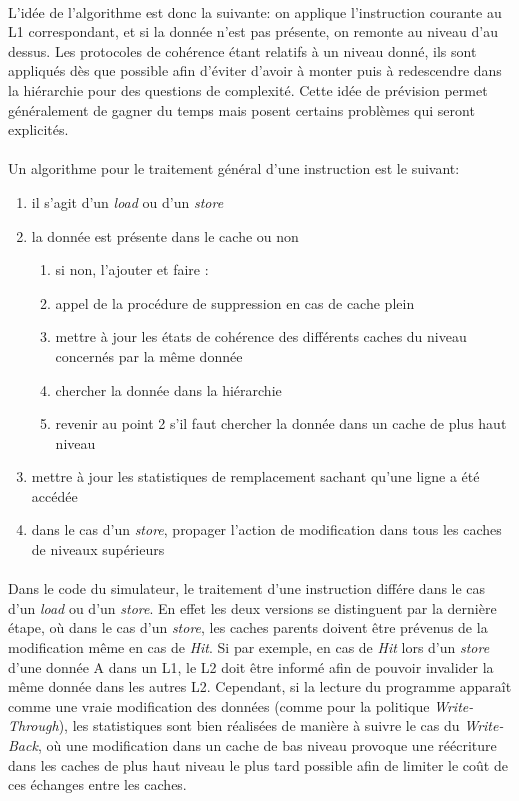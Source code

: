 \paragraph{}
L'idée de l'algorithme est donc la suivante: on applique l'instruction courante au L1 correspondant, et si la donnée n'est pas présente, on remonte au niveau d'au dessus. Les protocoles de cohérence étant relatifs à un niveau donné, ils sont appliqués dès que possible afin d'éviter d'avoir à monter puis à redescendre dans la hiérarchie pour des questions de complexité. Cette idée de prévision permet généralement de gagner du temps mais posent certains problèmes qui seront explicités.

\paragraph{}
Un algorithme pour le traitement général d'une instruction est le suivant: 
\begin{enumerate}
  \item{il s'agit d'un \emph{load} ou d'un \emph{store}}
  \item{la donnée est présente dans le cache ou non
      \begin{enumerate}
      \item{si non, l'ajouter et faire :}
      \item{appel de la procédure de suppression en cas de cache plein}
      \item{mettre à jour les états de cohérence des différents caches du niveau concernés par la même donnée}
      \item{chercher la donnée dans la hiérarchie}
      \item{revenir au point 2 s'il faut chercher la donnée dans un cache de plus haut niveau}
  \end{enumerate}}
  \item{mettre à jour les statistiques de remplacement sachant qu'une ligne a été accédée}
  \item{dans le cas d'un \emph{store}, propager l'action de modification dans tous les caches de niveaux supérieurs}
\end{enumerate}

\paragraph{}
Dans le code du simulateur, le traitement d'une instruction différe dans le cas d'un \emph{load} ou d'un \emph{store}. En effet les deux versions se distinguent par la dernière étape, où dans le cas d'un \emph{store}, les caches parents doivent être prévenus de la modification même en cas de \emph{Hit}. Si par exemple, en cas de \emph{Hit} lors d'un \emph{store} d'une donnée A dans un L1, le L2 doit être informé afin de pouvoir invalider la même donnée dans les autres L2. Cependant, si la lecture du programme apparaît comme une vraie modification des données (comme pour la politique \emph{Write-Through}), les statistiques sont bien réalisées de manière à suivre le cas du \emph{Write-Back}, où une modification dans un cache de bas niveau provoque une réécriture dans les caches de plus haut niveau le plus tard possible afin de limiter le coût de ces échanges entre les caches.


